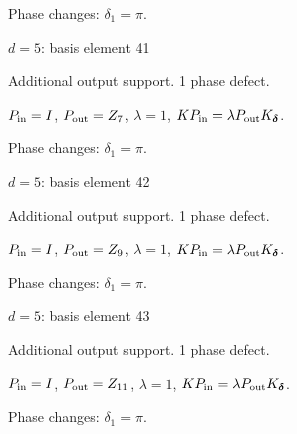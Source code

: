 \par\smallskip\begin{minipage}{.98\linewidth}\small Phase changes: $\delta_{1}=\pi$.\end{minipage}
\vfill
{\footnotesize\texttt{}}
\newpage
{}
{\Large $d=5$: basis element 41}\par
Additional output support. 1 phase defect.
\begin{center}
\end{center}
\vspace{-1mm}
$P_{\rm in}=I$, \quad $P_{\rm out}=Z_{7}$, \quad $\lambda=1$, \qquad $K P_{\rm in}=\lambda P_{\rm out}K_{\boldsymbol\delta}$.
\par\smallskip\begin{minipage}{.98\linewidth}\small Phase changes: $\delta_{1}=\pi$.\end{minipage}
\vfill
{\footnotesize\texttt{}}
\newpage
{}
{\Large $d=5$: basis element 42}\par
Additional output support. 1 phase defect.
\begin{center}
\end{center}
\vspace{-1mm}
$P_{\rm in}=I$, \quad $P_{\rm out}=Z_{9}$, \quad $\lambda=1$, \qquad $K P_{\rm in}=\lambda P_{\rm out}K_{\boldsymbol\delta}$.
\par\smallskip\begin{minipage}{.98\linewidth}\small Phase changes: $\delta_{1}=\pi$.\end{minipage}
\vfill
{\footnotesize\texttt{}}
\newpage
{}
{\Large $d=5$: basis element 43}\par
Additional output support. 1 phase defect.
\begin{center}
\end{center}
\vspace{-1mm}
$P_{\rm in}=I$, \quad $P_{\rm out}=Z_{11}$, \quad $\lambda=1$, \qquad $K P_{\rm in}=\lambda P_{\rm out}K_{\boldsymbol\delta}$.
\par\smallskip\begin{minipage}{.98\linewidth}\small Phase changes: $\delta_{1}=\pi$.\end{minipage}
